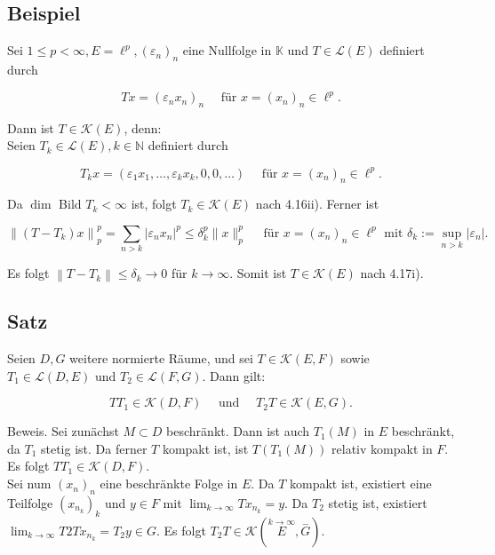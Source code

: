\documentclass[10pt, letterpaper]{article}
\begin{document}
\subsection*{Beispiel}
Sei $1 \leq p<\infty, E=\ell^{p},\left(\varepsilon_{n}\right)_{n}$ eine Nullfolge in $\mathbb{K}$ und $T \in \mathcal{L}(E)$ definiert durch

$$
T x=\left(\varepsilon_{n} x_{n}\right)_{n} \quad \text { für } x=\left(x_{n}\right)_{n} \in \ell^{p} .
$$

Dann ist $T \in \mathcal{K}(E)$, denn:\\
Seien $T_{k} \in \mathcal{L}(E), k \in \mathbb{N}$ definiert durch

$$
T_{k} x=\left(\varepsilon_{1} x_{1}, \ldots, \varepsilon_{k} x_{k}, 0,0, \ldots\right) \quad \text { für } x=\left(x_{n}\right)_{n} \in \ell^{p} .
$$

Da $\operatorname{dim}$ Bild $T_{k}<\infty$ ist, folgt $T_{k} \in \mathcal{K}(E)$ nach 4.16ii). Ferner ist

$$
\left\|\left(T-T_{k}\right) x\right\|_{p}^{p}=\sum_{n>k}\left|\varepsilon_{n} x_{n}\right|^{p} \leq \delta_{k}^{p}\|x\|_{p}^{p} \quad \text { für } x=\left(x_{n}\right)_{n} \in \ell^{p} \text { mit } \delta_{k}:=\sup _{n>k}\left|\varepsilon_{n}\right| .
$$

Es folgt $\left\|T-T_{k}\right\| \leq \delta_{k} \rightarrow 0$ für $k \rightarrow \infty$. Somit ist $T \in \mathcal{K}(E)$ nach 4.17i).

\subsection*{Satz}
Seien $D, G$ weitere normierte Räume, und sei $T \in \mathcal{K}(E, F)$ sowie $T_{1} \in \mathcal{L}(D, E)$ und $T_{2} \in \mathcal{L}(F, G)$. Dann gilt:

$$
T T_{1} \in \mathcal{K}(D, F) \quad \text { und } \quad T_{2} T \in \mathcal{K}(E, G) .
$$

Beweis. Sei zunächst $M \subset D$ beschränkt. Dann ist auch $T_{1}(M)$ in $E$ beschränkt, da $T_{1}$ stetig ist. Da ferner $T$ kompakt ist, ist $T\left(T_{1}(M)\right)$ relativ kompakt in $F$. Es folgt $T T_{1} \in \mathcal{K}(D, F)$.\\
Sei num $\left(x_{n}\right)_{n}$ eine beschränkte Folge in $E$. Da $T$ kompakt ist, existiert eine Teilfolge $\left(x_{n_{k}}\right)_{k}$ und $y \in F$ mit $\lim _{k \rightarrow \infty} T x_{n_{k}}=y$. Da $T_{2}$ stetig ist, existiert $\lim _{k \rightarrow \infty} T 2 T x_{n_{k}}=T_{2} y \in G$. Es folgt $T_{2} T \in \mathcal{K}(\stackrel{k \rightarrow \infty}{E}, \stackrel{-}{G})$.
\end{document}

